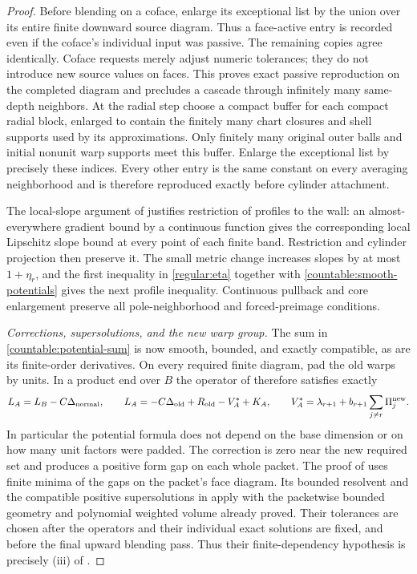 \documentclass[11pt]{article}
\numberwithin{equation}{section}
\theoremstyle{definition}
\theoremstyle{remark}
\begin{document}
\begin{proof}
Before blending on a coface, enlarge its exceptional list by the union
over its entire finite downward source diagram. Thus a face-active
entry is recorded even if the coface's individual input was passive.
The remaining copies agree identically. Coface requests merely adjust
numeric tolerances; they do not introduce new source values on faces.
This proves exact passive reproduction on the completed diagram and
precludes a cascade through infinitely many same-depth neighbors.
At the radial step choose a compact buffer for each compact radial
block, enlarged to contain the finitely many chart closures and shell
supports used by its approximations. Only finitely many original
outer balls and initial nonunit warp supports meet this buffer.
Enlarge the exceptional list by precisely these indices. Every other
entry is the same constant on every averaging neighborhood and is
therefore reproduced exactly before cylinder attachment.

The local-slope argument of  justifies restriction
of profiles to the wall: an almost-everywhere gradient bound by a
continuous function gives the corresponding local Lipschitz slope
bound at every point of each finite band. Restriction and cylinder
projection then preserve it. The small metric change increases slopes
by at most $1+\eta_r$, and the first inequality in \eqref{regular:eta}
together with \eqref{countable:smooth-potentials} gives the next profile
inequality.
Continuous pullback and core enlargement preserve all pole-neighborhood
and forced-preimage conditions.

\emph{Corrections, supersolutions, and the new warp group.}
The sum in \eqref{countable:potential-sum} is now smooth, bounded, and
exactly compatible, as are its finite-order derivatives. On every
required finite diagram, pad the old warps by units. In a product end
over $B$ the operator of  therefore satisfies
exactly
\[
 L_A=L_B-C\Delta_{\rm normal},\qquad
 L_A=-C\Delta_{\rm old}+R_{\rm old}-V_A^*+K_A,
 \qquad
 V_A^*=\lambda_{r+1}+b_{r+1}\sum_{j\ne r}\Pi_j^{\rm new}.
\]
In particular the potential formula does not depend on the base
dimension or on how many unit factors were padded. The correction is
zero near the new required set and produces a positive form gap on
each whole packet. The proof of  uses finite
minima of the gaps on the packet's face diagram. Its bounded resolvent
and the compatible positive supersolutions in
 apply with the packetwise
bounded geometry and polynomial weighted volume already proved.
Their tolerances are chosen after the operators and their individual
exact solutions are fixed, and before the final upward blending pass.
Thus their finite-dependency hypothesis is precisely (iii) of
.


\end{proof}
\end{document}
